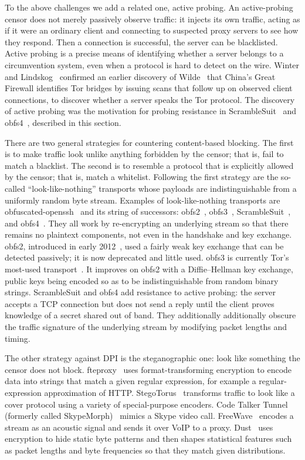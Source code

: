 \documentclass{sig-alternate}
\begin{document}
To the above challenges we add a related one, active probing.
An active-probing censor does not merely passively observe traffic:
it injects its own traffic,
acting as if it were an ordinary client and connecting to suspected
proxy servers to see how they respond.
Then a connection is successful, the server can be blacklisted.
Active probing is a precise means of identifying whether a server belongs to a circumvention system,
even when a protocol is hard to detect on the wire.
Winter and Lindskog~\cite{foci12-winter} confirmed an earlier discovery of
Wilde~\cite{wilde} that China's Great Firewall identifies Tor bridges
by issuing scans that follow up on observed client connections, to discover
whether a server speaks the Tor protocol.
The discovery of active probing was the motivation for probing resistance in ScrambleSuit~\cite{scramblesuit}
and obfs4~\cite{obfs4},
described in this section.


There are two general strategies for countering content-based blocking.
The first is to make traffic look unlike
anything forbidden by the censor; that is, fail to match a blacklist. The second is
to resemble a protocol that is explicitly allowed by the censor; that is, match a whitelist.
Following the first strategy are the so-called ``look-like-nothing'' transports whose
payloads are indistinguishable from a uniformly random byte stream.
Examples of look-like-nothing transports are
obfuscated-openssh~\cite{obfuscated-openssh} and its string of successors:
obfs2~\cite{obfs2}, obfs3~\cite{obfs3}, ScrambleSuit~\cite{scramblesuit}, and obfs4~\cite{obfs4}.
They all work by re-encrypting
an underlying stream so that there remains no plaintext components,
not even in the handshake and key exchange.
obfs2, introduced in early 2012~\cite{obfsproxy-arms-race},
used a fairly weak key exchange that can be detected passively;
it is now deprecated and little used.
obfs3 is currently Tor's most-used transport~\cite{metrics-obfs3}.
It improves on obfs2 with a Diffie--Hellman key exchange,
public keys being encoded so as to be indistinguishable from random binary strings.
ScrambleSuit and obfs4 add resistance to active probing:
the server accepts a TCP connection but does not send a reply
until the client proves knowledge of a secret shared out of band.
They additionally additionally obscure the traffic signature of the underlying stream
by modifying packet lengths and timing.

The other strategy against DPI is the steganographic one: look like
something the censor does not block.
fteproxy~\cite{fte} uses format-transforming encryption to encode data into strings
that match a given regular expression,
for example a regular-expression approximation of HTTP.
StegoTorus~\cite{stegotorus}
transforms traffic to look like a cover protocol
using a variety of special-purpose encoders.
Code Talker
Tunnel (formerly called SkypeMorph)~\cite{skypemorph} mimics a Skype video call.
FreeWave~\cite{freewave} encodes a stream as an acoustic signal
and sends it over VoIP to a proxy.
Dust~\cite{dust} uses encryption to hide static byte patterns and then
shapes statistical features such as packet lengths and byte frequencies so that they
match given distributions.
\end{document}
